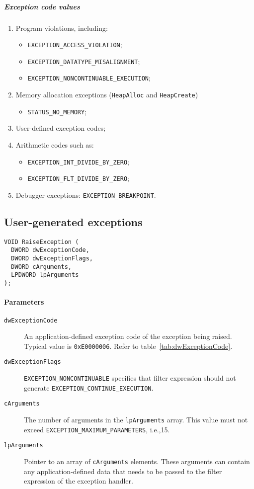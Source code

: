 \subparagraph{Exception code values}
\begin{enumerate}
\item Program violations, including:
\begin{itemize}
\item \texttt{EXCEPTION\_ACCESS\_VIOLATION};
\item \texttt{EXCEPTION\_DATATYPE\_MISALIGNMENT};
\item \texttt{EXCEPTION\_NONCONTINUABLE\_EXECUTION};
\end{itemize}
\item Memory allocation exceptions (\texttt{HeapAlloc} and \texttt{HeapCreate})
\begin{itemize}
\item \texttt{STATUS\_NO\_MEMORY};
\end{itemize}
\item User-defined exception codes;
\item Arithmetic codes such as:
\begin{itemize}
\item \texttt{EXCEPTION\_INT\_DIVIDE\_BY\_ZERO};
\item \texttt{EXCEPTION\_FLT\_DIVIDE\_BY\_ZERO};
\end{itemize}
\item Debugger exceptions: \texttt{EXCEPTION\_BREAKPOINT}.
\end{enumerate}

\subsection{User-generated exceptions}
\begin{verbatim}
VOID RaiseException (
  DWORD dwExceptionCode,
  DWORD dwExceptionFlags,
  DWORD cArguments,
  LPDWORD lpArguments
);
\end{verbatim}

\paragraph{Parameters}
\begin{description}
\item [\texttt{dwExceptionCode}] An application-defined exception code of the exception being raised. Typical value is \texttt{0xE0000006}. Refer to table~\ref{tab:dwExceptionCode}.
\item [\texttt{dwExceptionFlags}] \texttt{EXCEPTION\_NONCONTINUABLE} specifies that filter expression should not generate \texttt{EXCEPTION\_CONTINUE\_EXECUTION}.
\item [\texttt{cArguments}] The number of arguments in the \texttt{lpArguments} array. This value must not exceed \texttt{EXCEPTION\_MAXIMUM\_PARAMETERS}, i.e.,\@ 15.
\item [\texttt{lpArguments}] Pointer to an array of \texttt{cArguments} elements. These arguments can contain any application-defined data that needs to be passed to the filter expression of the exception handler.
\end{description}

